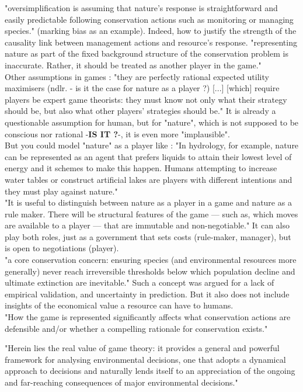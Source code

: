 \documentclass[12pt]{article}
\begin{document}
"oversimplification is assuming that nature’s response is straightforward and easily predictable following conservation actions such as monitoring or managing species." (marking bias as an example). Indeed, how to justify the strength of the causality link between management actions and resource's response.
"representing nature as part of the fixed background structure of the
conservation problem is inaccurate. Rather, it should be treated
as another player in the game."\\
Other assumptions in games : "they are perfectly rational
expected utility maximisers (ndlr. - is it the case for nature as a player ?) [...] [which] require players be expert game theorists: they must know
not only what their strategy should be, but also what other players’
strategies should be." It is already a questionable assumption for human, but for "nature", which is not supposed to be conscious nor rational -\textbf{IS IT ?}-, it is even more "implausible".\\
But you could model "nature" as a player like : "In hydrology, for example, nature
can be represented as an agent that prefers liquids to attain their
lowest level of energy and it schemes to make this happen. Humans attempting to increase water tables or construct artificial lakes are players
with different intentions and they must play against nature."\\
"It is useful to distinguish between nature as a player in a game
and nature as a rule maker. There will be structural features of the
game — such as, which moves are available to a player — that are
immutable and non-negotiable." It can also play both roles, just as a government that sets costs (rule-maker, manager), but is open to negotiations (player).\\
"a core conservation
concern: ensuring species (and environmental resources more generally) never reach irreversible thresholds below which population
decline and ultimate extinction are inevitable." Such a concept was argued for a lack of empirical validation, and uncertainty in prediction. But it also does not include insights of the economical value a resource can have to humans.\\

"How the game is represented significantly affects what conservation actions are defensible and/or whether a compelling rationale for conservation exists."

"Herein lies
the real value of game theory: it provides a general and powerful
framework for analysing environmental decisions, one that
adopts a dynamical approach to decisions and naturally lends itself to an appreciation of the ongoing and far-reaching consequences of major environmental decisions."
\end{document}
